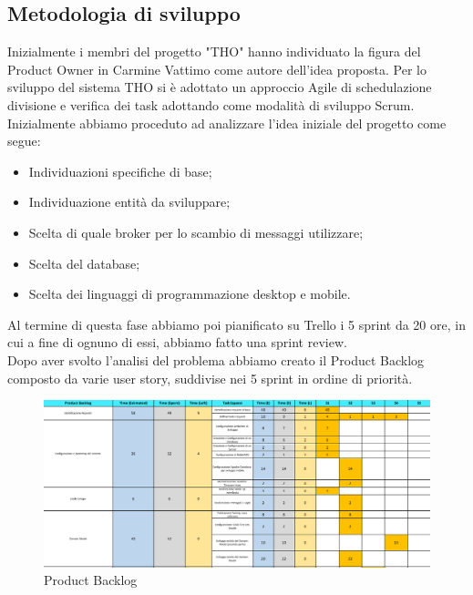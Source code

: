 \documentclass[12pt, italian]{article}
\begin{document}
\subsection{Metodologia di sviluppo}
Inizialmente i membri del progetto "THO" hanno individuato la figura del Product Owner in Carmine Vattimo come autore dell'idea proposta. Per lo sviluppo del sistema THO si è adottato un approccio Agile di schedulazione divisione e verifica dei task adottando come modalità di sviluppo Scrum. 
\\ Inizialmente abbiamo proceduto ad analizzare l'idea iniziale del progetto come segue:
\begin{itemize}
	\item Individuazioni specifiche di base;
	\item Individuazione entità da sviluppare;
	\item Scelta di quale broker per lo scambio di messaggi utilizzare;
	\item Scelta del database;
	\item Scelta dei linguaggi di programmazione desktop e mobile.
\end{itemize}

Al termine di questa fase abbiamo poi pianificato su Trello i 5 sprint da 20 ore, in cui a fine di ognuno di essi, abbiamo fatto una sprint review.\\Dopo aver svolto l'analisi del problema abbiamo creato il Product Backlog composto da varie user story, suddivise nei 5 sprint in ordine di priorità. \\

\begin{figure}[H]
    \centering
    \includegraphics[width=1\textwidth]{img/backlog01.png}
    \caption{Product Backlog}
\end{figure}
\end{document}
